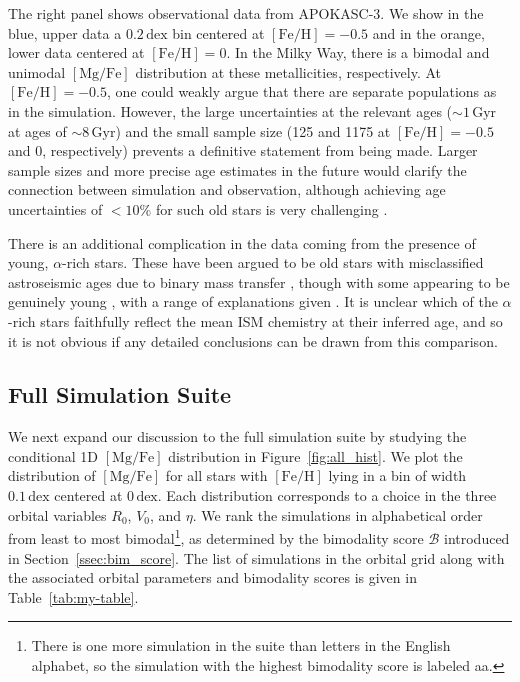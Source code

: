 \documentclass[twocolumn,linenumbers,trackchanges]{aastex631}
\newcommand{\Gyr}{\ensuremath{\textrm{Gyr}}}
\newcommand{\FeH}{\ensuremath{[\textrm{Fe}/\textrm{H}]}}
\newcommand{\MgFe}{\ensuremath{[\textrm{Mg}/\textrm{Fe}]}}
\newcommand{\dex}{\ensuremath{\textrm{dex}}}
\begin{document}
The right panel shows observational data from APOKASC-3. We show in the blue, upper data a $0.2\,\dex$ bin centered at $\FeH=-0.5$ and in the orange, lower data centered at $\FeH=0$. In the Milky Way, there is a bimodal and unimodal \MgFe{} distribution at these metallicities, respectively. At $\FeH=-0.5$, one could weakly argue that there are separate populations as in the simulation. However, the large uncertainties at the relevant ages ($\sim1\,\Gyr$ at ages of $\sim8\,\Gyr$) and the small sample size (125 and 1175 at $\FeH=-0.5$ and $0$, respectively) prevents a definitive statement from being made. Larger sample sizes and more precise age estimates in the future would clarify the connection between simulation and observation, although achieving age uncertainties of $<10\%$ for such old stars is very challenging \citep[e.g.][]{2010ARA&A..48..581S}.

There is an additional complication in the data coming from the presence of young, $\alpha$-rich stars. These have been argued to be old stars with misclassified astroseismic ages due to binary mass transfer \citep[and references therein]{2023A&A...671A..21J}, though with some appearing to be genuinely young \citep[and references therein]{2024arXiv241002962L}, with a range of explanations given \citep[e.g.][]{2015A&A...576L..12C,2021MNRAS.508.4484J,2023arXiv231105815S}. It is unclear which of the $\alpha$-rich stars faithfully reflect the mean ISM chemistry at their inferred age, and so it is not obvious if any detailed conclusions can be drawn from this comparison.

\subsection{Full Simulation Suite}\label{ssec:full_sim_suite}
We next expand our discussion to the full simulation suite by studying the conditional 1D \MgFe{} distribution in Figure~\ref{fig:all_hist}. We plot the distribution of \MgFe{} for all stars with \FeH{} lying in a bin of width $0.1\,\dex$ centered at $0\,\dex$. Each distribution corresponds to a choice in the three orbital variables $R_0$, $V_0$, and $\eta$. We rank the simulations in alphabetical order from least to most bimodal\footnote{There is one more simulation in the suite than letters in the English alphabet, so the simulation with the highest bimodality score is labeled aa.}, as determined by the bimodality score $\mathcal{B}$ introduced in Section~\ref{ssec:bim_score}. The list of simulations in the orbital grid along with the associated orbital parameters and bimodality scores is given in Table~\ref{tab:my-table}.
\end{document}
